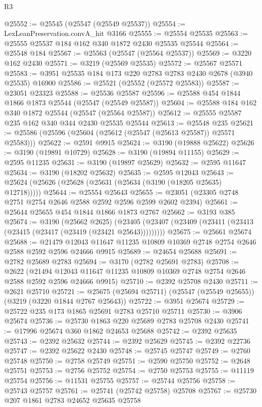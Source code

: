 \begin{lexlean}{R3}
\begin{coremodule}
@25552 := @25545 (@25547 (@25549 @25537))
@25554 := LexLeanPreservation.convA_hit @3166
@25555 := @25554 @25535
@25563 := @25555 @25537 @184 @162 @340 @1872 @2430 @25535 @25544
@25564 := @25548 @184
@25567 := @25563 (@25547 (@25564 @25537))
@25569 := @3220 @162 @2430
@25571 := @3219 (@25569 @25535)
@25572 := @25567 @25571
@25583 := @3951 @25535 @184 @173 @220 @2783 @2783 @2430 @2678 (@3940 @25535) @16900
@25586 := @25521 (@25552 (@25572 @25583))
@25587 := @23051 @23323
@25588 := @25536 @25587
@25596 := @25588 @454 @1844 @1866 @1873 @25544 (@25547 (@25549 @25587))
@25604 := @25588 @184 @162 @340 @1872 @25544 (@25547 (@25564 @25587))
@25612 := @25555 @25587 @235 @162 @340 @344 @2430 @25535 @25544
@25613 := @25548 @235
@25621 := @25586 (@25596 (@25604 (@25612 (@25547 (@25613 @25587)) @25571 @25583)))
@25622 := @2591 @9915
@25624 := @3190 (@19888 @25622)
@25626 := @3190 (@19891 @10729)
@25628 := @3190 (@19894 @11155)
@25629 := @2595 @11235
@25631 := @3190 (@19897 @25629)
@25632 := @2595 @11647
@25634 := @3190 (@18202 @25632)
@25635 := @2595 @12043
@25643 := @25624 (@25626 (@25628 (@25631 (@25634 (@3190 (@18205 @25635) @12718)))))
@25644 := @25554 @25643
@25655 := @23051 (@23305 @2748 @2751 @2754 @2646 @2588 @2592 @2596 @2599 @2602 @2394)
@25661 := @25644 @25655 @454 @1844 @1866 @1873 @2767
@25662 := @3193 @385
@25674 := @3190
    (@25662 @2625)
    (@23405 (@23407 (@23409 (@23411 (@23413 (@23415 (@23417 (@23419 (@23421 @25643)))))))))
@25675 := @25661 @25674
@25688 := @21479 @12043 @11647 @11235 @10809 @10369 @2748 @2754 @2646 @2588 @2592 @2596 @24666 @9915
@25689 := @24654 @25688
@25691 := @2782 @25689 @2783
@25694 := @3170 (@2782 @25691 @2783)
@25708 := @2622
    (@21494 @12043 @11647 @11235 @10809 @10369 @2748 @2754 @2646 @2588 @2592 @2596 @24666 @9915)
@25710 := @2392 @25708 @2430
@25711 := @2621 @25710
@25721 := @25675 (@25694 @25711) (@25547 (@25549 @25655)) (@3219 (@3220 @1844 @2767 @25643))
@25722 := @3951 @25674
@25729 := @25722 @235 @173 @1865 @25691 @2783 @25710 @25711
@25730 := @3906 @25674
@25736 := @25730 @1863 @220 @25689 @2783 @25708 @2430
@25741 := @17996 @25674 @360 @1862 @24653 @25688
@25742 := @2392 @25635
@25743 := @2392 @25632
@25744 := @2392 @25629
@25745 := @2392 @22736
@25747 := @2392 @25622 @2430
@25748 := @25745 @25747
@25749 := @2760 @25748
@25750 := @2758 @25749
@25751 := @2590 @25750
@25752 := @2648 @25751
@25753 := @2756 @25752
@25754 := @2750 @25753
@25755 := @11119 @25754
@25756 := @11531 @25755
@25757 := @25744 @25756
@25758 := @25743 @25757
@25761 := @25741 (@25742 @25758) @25708
@25767 := @25730 @207 @1861 @2783 @24652 @25635 @25758

\end{coremodule}
\end{lexlean}
